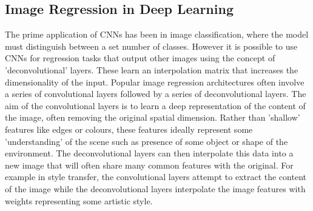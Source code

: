 \documentclass[ %
                    author={Gavin Parker},
                supervisor={Dr. Neill Campbell},
                    degree={MEng},
                     title={Deep Siamese Networks for Illumination Estimation from Stereo Images},
                  subtitle={},
                      type={research},
                      year={2018} ]{dissertation}
\begin{document}
\subsection{Image Regression in Deep Learning}
The prime application of CNNs has been in image classification, where the model must distinguish between a set number of classes. However it is possible to use CNNs for regression tasks that output other images using the concept of 'deconvolutional' layers. These learn an interpolation matrix that increases the dimensionality of the input. Popular image regression architectures often involve a series of convolutional layers followed by a series of deconvolutional layers. The aim of the convolutional layers is to learn a deep representation of the content of the image, often removing the original spatial dimension. Rather than 'shallow' features like edges or colours, these features ideally represent some 'understanding' of the scene such as presence of some object or shape of the environment. The deconvolutional layers can then interpolate this data into a new image that will often share many common features with the original. For example in style transfer, the convolutional layers attempt to extract the content of the image while the deconvolutional layers interpolate the image features with weights representing some artistic style.
\end{document}
